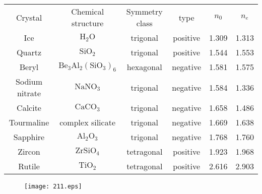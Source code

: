\documentclass[12pt]{book}
\begin{document}
\begin{table}[htdp]\scriptsize
\begin{tabular}{cccccc}\label{tab:2.1}

  Crystal & Chemical structure & Symmetry class & type & $n_0$ & $n_e$\\

  Ice & $\mathrm{H_2O}$ & trigonal & positive & 1.309 & 1.313 \\
  Quartz & $\mathrm{SiO_2}$ & trigonal & positive & 1.544 & 1.553 \\
  Beryl & $\mathrm{Be_3Al_2(SiO_3)_6}$ & hexagonal & negative & 1.581 & 1.575 \\
  Sodium nitrate & $\mathrm{NaNO_3}$ & trigonal & negative & 1.584 & 1.336 \\
  Calcite & $\mathrm{CaCO_3}$ & trigonal & negative & 1.658 & 1.486 \\
  Tourmaline & complex silicate & trigonal & negative & 1.669 & 1.638 \\
  Sapphire & $\mathrm{Al_2O_3}$ & trigonal & negative & 1.768 & 1.760 \\
  Zircon & $\mathrm{ZrSiO_4}$ & tetragonal & positive & 1.923 & 1.968 \\
  Rutile & $\mathrm{TiO_2}$ & tetragonal & positive & 2.616 & 2.903 \\

\end{tabular}
\end{table}

\begin{figure}
  \centering
  \texttt{[image: 211.eps]}\\
  \label{fig:2.11}
\end{figure}
\end{document}
